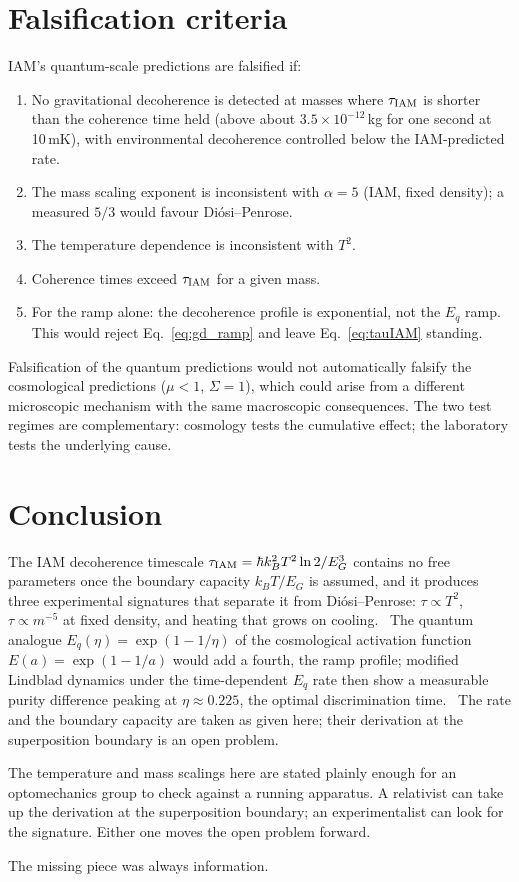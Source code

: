 \section{Falsification criteria}\label{sec:gd_falsify}
IAM's quantum-scale predictions are falsified if:
\begin{enumerate}
\item No gravitational decoherence is detected at masses where $\tau_{\rm IAM}$ is shorter than the coherence time held (above about
$3.5\times10^{-12}$\,kg for one second at 10\,mK), with environmental decoherence controlled below the IAM-predicted rate.
\item The mass scaling exponent is inconsistent with $\alpha=5$ (IAM, fixed density); a measured $5/3$ would favour Di\'osi--Penrose.
\item The temperature dependence is inconsistent with $T^2$.
\item Coherence times exceed $\tau_{\rm IAM}$ for a given mass.
\item For the ramp alone: the decoherence profile is exponential, not the $E_q$ ramp. This would reject Eq.~\eqref{eq:gd_ramp} and leave
Eq.~\eqref{eq:tauIAM} standing.
\end{enumerate}
Falsification of the quantum predictions would not automatically falsify the cosmological predictions ($\mu<1$, $\Sigma=1$), which could arise from a
different microscopic mechanism with the same macroscopic consequences. The two test regimes are complementary: cosmology tests the cumulative effect; the
laboratory tests the underlying cause.

\section{Conclusion}\label{sec:gd_conclusion}
The IAM decoherence timescale $\tau_{\rm IAM}=\hbar k_B^2T^2\ln2/E_G^3$ contains no free parameters once the boundary capacity $k_BT/E_G$ is assumed, and it
produces three experimental signatures that separate it from Di\'osi--Penrose: $\tau\propto T^2$, $\tau\propto m^{-5}$ at fixed density, and heating that
grows on cooling. \prediction\ The quantum analogue $E_q(\eta)=\exp(1-1/\eta)$ of the cosmological activation function $E(a)=\exp(1-1/a)$ would add a fourth,
the ramp profile; modified Lindblad dynamics under the time-dependent $E_q$ rate then show a measurable purity difference peaking at $\eta\approx0.225$, the
optimal discrimination time. \conjecture\ The rate and the boundary capacity are taken as given here; their derivation at the superposition boundary is an open problem.
\openprob

The temperature and mass scalings here are stated plainly enough for an optomechanics group to check against a running apparatus. A relativist can take up the derivation at the superposition boundary; an experimentalist can look for the signature. Either one moves the open problem forward.

The missing piece was always information.
